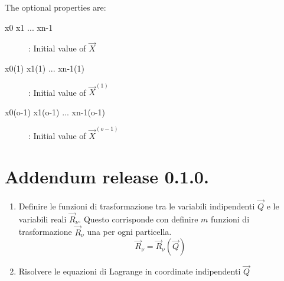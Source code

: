\documentclass[a4paper,twoside]{article}
\begin{document}
The optional properties are:
\begin{description}
	\item[x0 x1 ... xn-1]: Initial value of $\vec X$
	\item[x0(1) x1(1) ... xn-1(1)]: Initial value of $\vec X^{(1) }$
	\item[x0(o-1) x1(o-1) ... xn-1(o-1)]: Initial value of $\vec X^{(o-1) }$
\end{description}


\section{Addendum release 0.1.0.}

\begin{enumerate}
\item
Definire le funzioni di trasformazione tra le variabili indipendenti $\vec Q$ e le variabili reali $\vec R_\nu$.
Questo corrisponde con definire $m$ funzioni di trasformazione  $\vec R_\nu$ una per ogni particella.
\begin{equation}
	\vec R_\nu = \vec R_\nu(\vec Q)
\end{equation}

\item
Risolvere le equazioni di Lagrange in coordinate indipendenti $\vec Q$


\end{enumerate}
\end{document}
